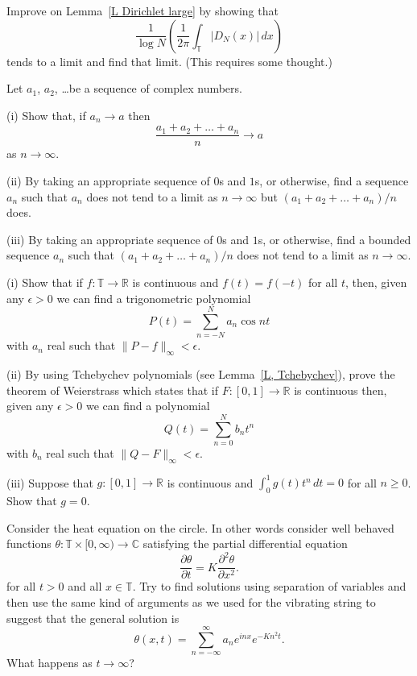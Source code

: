 \begin{question} Improve on Lemma~\ref{L Dirichlet large}
by showing that
\[\frac{1}{\log N}\left(\frac{1}{2\pi}
\int_{\mathbb T}|D_{N}(x)|\,dx\right)\]
tends to a limit and find that limit. (This requires some thought.)
\end{question}
\begin{question} Let $a_{1}$, $a_{2}$, \dots be a sequence
of complex numbers.

(i) Show that, if $a_{n}\rightarrow a$ then
\[\frac{a_{1}+a_{2}+\dots+a_{n}}{n}\rightarrow a\]
as $n\rightarrow\infty$.

(ii) By taking an appropriate sequence of $0$s and $1$s,
or otherwise, find a sequence $a_{n}$ such that
$a_{n}$ does not tend to a limit as $n\rightarrow\infty$
but $(a_{1}+a_{2}+\dots+a_{n})/n$ does.

(iii) By taking an appropriate sequence of $0$s and $1$s,
or otherwise, find a bounded sequence $a_{n}$ such that
$(a_{1}+a_{2}+\dots+a_{n})/n$ does not tend to a limit
as $n\rightarrow\infty$.
\end{question}
\begin{question} (i) Show that if $f:{\mathbb T}\rightarrow{\mathbb R}$
is continuous and $f(t)=f(-t)$ for all $t$,
then, given any $\epsilon>0$ we can find a
trigonometric polynomial
\[P(t)=\sum_{n=-N}^{N}a_{n}\cos nt\]
with $a_{n}$ real such that $\|P-f\|_{\infty}<\epsilon$.

(ii) By using Tchebychev polynomials
(see Lemma~\ref{L, Tchebychev}),
prove the theorem of Weierstrass which states that if
$F:[0,1]\rightarrow{\mathbb R}$ is continuous
then, given any $\epsilon>0$ we can find a
polynomial
\[Q(t)=\sum_{n=0}^{N}b_{n}t^{n}\]
with $b_{n}$ real such that $\|Q-F\|_{\infty}<\epsilon$.

(iii) Suppose that $g:[0,1]\rightarrow{\mathbb R}$ is continuous
and $\int_{0}^{1}g(t)t^{n}\,dt=0$ for all $n\geq 0$.
Show that $g=0$.
\end{question}
\begin{question} Consider the heat equation on the circle.
In other words consider well behaved functions
$\theta:{\mathbb T}\times[0,\infty)\rightarrow{\mathbb C}$
satisfying the partial differential equation
\[
\frac{\partial\theta}{\partial t}
=K\frac{\partial^{2} \theta}{\partial x^{2}}.
\]
for all $t>0$ and all $x\in{\mathbb T}$.
Try to find solutions using separation of variables and
then use the same kind of arguments as we used for the
vibrating string to suggest that the general solution
is
\[\theta(x,t)=\sum_{n=-\infty}^{\infty}a_{n}e^{inx}e^{-Kn^{2}t}.\]
What happens as $t\rightarrow \infty$?
\end{question}

